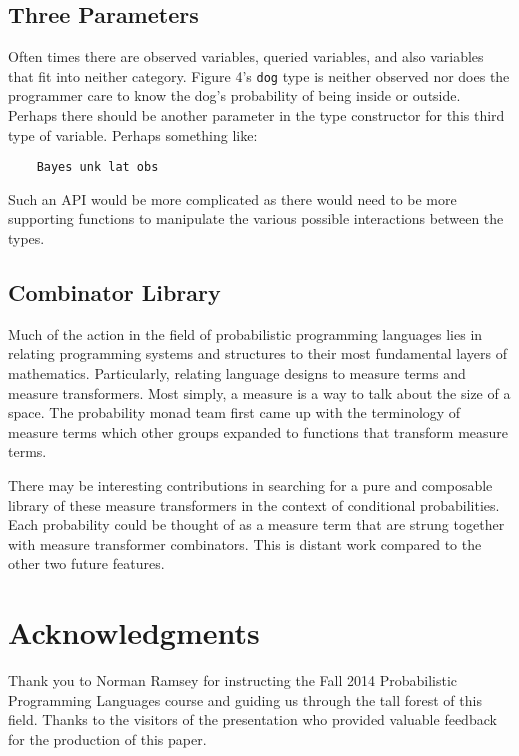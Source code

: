 \documentclass[9pt,twocolumn]{article}
\begin{document}
\subsection{Three Parameters}
Often times there are observed variables, queried variables, and also variables that fit into neither category. Figure 4's \texttt{dog} type is neither observed nor does the programmer care to know the dog's probability of being inside or outside. Perhaps there should be another parameter in the type constructor for this third type of variable. Perhaps something like:
\begin{verbatim}
    Bayes unk lat obs
\end{verbatim}
Such an API would be more complicated as there would need to be more supporting functions to manipulate the various possible interactions between the types.

\subsection{Combinator Library}
Much of the action in the field of probabilistic programming languages lies in relating programming systems and structures to their most fundamental layers of mathematics. Particularly, relating language designs to measure terms and measure transformers. Most simply, a measure is a way to talk about the size of a space. The probability monad team first came up with the terminology of measure terms which other groups expanded to functions that transform measure terms.

There may be interesting contributions in searching for a pure and composable library of these measure transformers in the context of conditional probabilities. Each probability could be thought of as a measure term that are strung together with measure transformer combinators. This is distant work compared to the other two future features.

\section{Acknowledgments}
Thank you to Norman Ramsey for instructing the Fall 2014 Probabilistic Programming Languages course and guiding us through the tall forest of this field. Thanks to the visitors of the presentation who provided valuable feedback for the production of this paper.
\end{document}
